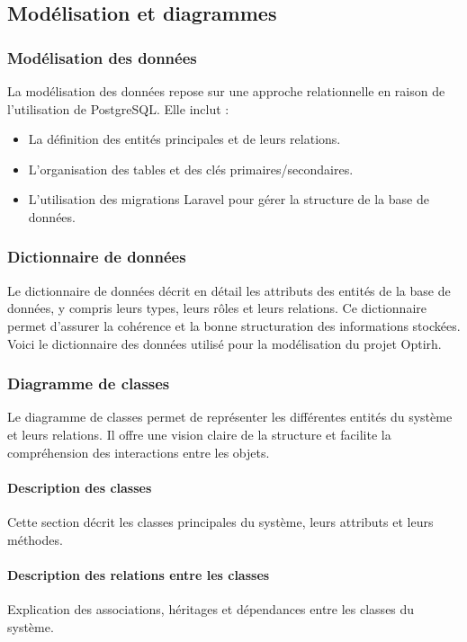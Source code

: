 \subsection{Modélisation et diagrammes}

\subsubsection{Modélisation des données}
La modélisation des données repose sur une approche relationnelle en raison de l'utilisation de PostgreSQL. Elle inclut :
\begin{itemize}
    \item La définition des entités principales et de leurs relations.
    \item L'organisation des tables et des clés primaires/secondaires.
    \item L'utilisation des migrations Laravel pour gérer la structure de la base de données.
\end{itemize}

\subsubsection{Dictionnaire de données}
Le dictionnaire de données décrit en détail les attributs des entités de la base de données, y compris leurs types, leurs rôles et leurs relations. Ce dictionnaire permet d'assurer la cohérence et la bonne structuration des informations stockées. Voici le dictionnaire des données utilisé pour la modélisation du projet Optirh.

\subsubsection{Diagramme de classes}
Le diagramme de classes permet de représenter les différentes entités du système et leurs relations. Il offre une vision claire de la structure et facilite la compréhension des interactions entre les objets.

\paragraph{Description des classes}
Cette section décrit les classes principales du système, leurs attributs et leurs méthodes.

\paragraph{Description des relations entre les classes}
Explication des associations, héritages et dépendances entre les classes du système.

